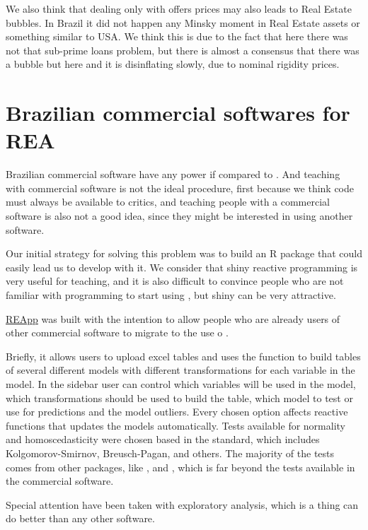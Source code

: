 \documentclass[article]{jss}
\begin{document}
We also think that dealing only with offers prices may also leads to
Real Estate bubbles. In Brazil it did not happen any Minsky moment in
Real Estate assets or something similar to USA. We think this is due to
the fact that here there was not that sub-prime loans problem, but there
is almost a consensus that there was a bubble but here and it is
disinflating slowly, due to nominal rigidity prices.

\section{Brazilian commercial softwares for
REA}\label{brazilian-commercial-softwares-for-rea}

Brazilian commercial software have any power if compared to
. And teaching with commercial software is not the ideal
procedure, first because we think code must always be available to
critics, and teaching people with a commercial software is also not a
good idea, since they might be interested in using another software.

Our initial strategy for solving this problem was to build an R package
that could easily lead us to develop  with it. We
consider that shiny reactive programming is very useful for teaching,
and it is also difficult to convince people who are not familiar with
programming to start using , but shiny can be very
attractive.

\href{https://droubi.shinyapps.io/REApp/}{REApp} was built with the
intention to allow people who are already users of other commercial
software to migrate to the use o .

Briefly, it allows users to upload excel tables and uses the
  function to build tables of several
different models with different transformations for each variable in the
model. In the sidebar user can control which variables will be used in
the model, which transformations should be used to build the table,
which model to test or use for predictions and the model outliers. Every
chosen option affects reactive functions that updates the models
automatically. Tests available for normality and homoscedasticity were
chosen based in the standard, which includes Kolgomorov-Smirnov,
Breusch-Pagan, and others. The majority of the tests comes from other
packages, like ,  and , which is
far beyond the tests available in the commercial software.

Special attention have been taken with exploratory analysis, which is a
thing  can do better than any other software.
\end{document}
